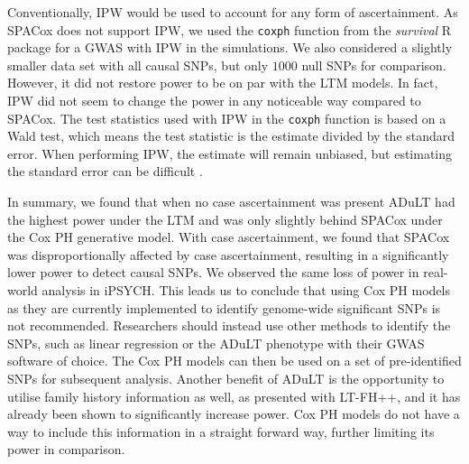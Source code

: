 Conventionally, IPW would be used to account for any form of ascertainment. As SPACox does not support IPW, we used the \texttt{coxph} function from the \textit{survival} R package \cite{Therneau2020-xf} for a GWAS with IPW in the simulations. We also considered a slightly smaller data set with all causal SNPs, but only $ 1000 $ null SNPs for comparison. However, it did not restore power to be on par with the LTM models. In fact, IPW did not seem to change the power in any noticeable way compared to SPACox. The test statistics used with IPW in the \texttt{coxph} function is based on a Wald test\cite{survivalVignette}, which means the test statistic is the estimate divided by the standard error. When performing IPW, the estimate will remain unbiased, but estimating the standard error can be difficult \cite{austin2016variance}. 

In summary, we found that when no case ascertainment was present ADuLT had the highest power under the LTM and was only slightly behind SPACox under the Cox PH generative model. With case ascertainment, we found that SPACox was disproportionally affected by case ascertainment, resulting in a significantly lower power to detect causal SNPs. We observed the same loss of power in real-world analysis in iPSYCH. This leads us to conclude that using Cox PH models as they are currently implemented to identify genome-wide significant SNPs is not recommended. Researchers should instead use other methods to identify the SNPs, such as linear regression or the ADuLT phenotype with their GWAS software of choice. The Cox PH models can then be used on a set of pre-identified SNPs for subsequent analysis. Another benefit of ADuLT is the opportunity to utilise family history information as well, as presented with LT-FH++, and it has already been shown to significantly increase power. Cox PH models do not have a way to include this information in a straight forward way, further limiting its power in comparison.










